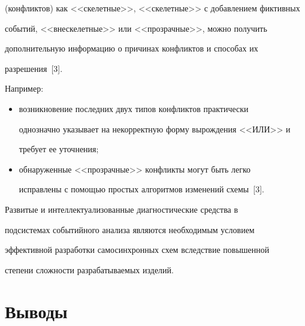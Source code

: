(конфликтов) как <<скелетные>>, <<скелетные>> с добавлением фиктивных 


событий, <<внескелетные>> или <<прозрачные>>, можно получить 


дополнительную информацию о причинах конфликтов и способах их 


разрешения~[3].


            Например: 


      \begin{itemize}


      \item  возникновение последних двух типов конфликтов практически 


однозначно указывает на некорректную форму вырождения <<ИЛИ>> и 


требует ее уточнения;


\item   обнаруженные <<прозрачные>> конфликты могут быть легко 


исправлены с помощью простых алгоритмов изменений схемы~[3].


\end{itemize}





      Развитые и интеллектуализованные диагностические средства в 


подсистемах событийного анализа являются необходимым условием 


эффективной разработки самосинхронных схем вследствие повышенной 


степени сложности разра\-ба\-ты\-ва\-емых изделий.





\section{Выводы}





\noindent


